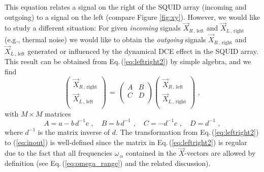 %
This equation relates a signal on the right of the SQUID array (incoming and outgoing)
to a signal on the left (compare Figure \ref{fig:xy}).
However, we would like to study a different situation: For given
{\em incoming} signals $\vec{X}_{R\,,\,\text{left}}$ and $\vec{X}_{L\,,\,\text{right}}$ 
(e.g., thermal noise) we would like to obtain the {\em outgoing} signals 
$\vec{X}_{R\,,\,\text{right}}$ and $\vec{X}_{L\,,\,\text{left}}$ generated or influenced 
by the dynamical DCE effect in the SQUID array.
This result can be obtained from Eq.\,(\ref{eq:leftright2}) by simple algebra, 
and we find
%
\begin{equation} \label{eq:inout}
\begin{pmatrix}
\vec{X}_{R\,,\,\text{right}} \\
\vec{X}_{L\,,\,\text{left}} \\
\end{pmatrix} \, = \,
\begin{pmatrix}
A & B \\
C & D \\
\end{pmatrix}
\begin{pmatrix}
\vec{X}_{R\,,\,\text{left}} \\
\vec{X}_{L\,,\,\text{right}} \\
\end{pmatrix} \, \, ,
\end{equation}
%
with $M \times M$ matrices
%
\begin{equation} \label{eq:bigabcd}
A = a - b \, d^{-1} c \, \, , \quad B = b \, d^{-1}  \, \, , \quad
C = - d^{-1} c \, \, , \quad D = d^{-1} \, \, ,
\end{equation}
%
where $d^{-1}$ is the matrix inverse of $d$. 
The transformation from Eq.\,(\ref{eq:leftright2}) to (\ref{eq:inout}) is 
well-defined since the matrix in Eq.\,(\ref{eq:leftright2}) is regular
due to the fact that all frequencies $\omega_{\,\alpha}$ contained in the 
$\vec{X}$-vectors are allowed 
by definition (see Eq.\,(\ref{eq:omega_range}) and the related discussion). 

